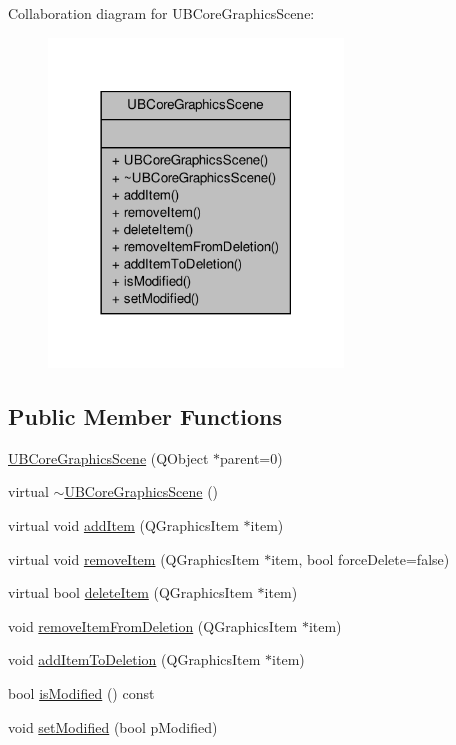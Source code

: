 Collaboration diagram for U\-B\-Core\-Graphics\-Scene\-:
\nopagebreak
\begin{figure}[H]
\begin{center}
\leavevmode
\includegraphics[width=222pt]{dd/d20/class_u_b_core_graphics_scene__coll__graph}
\end{center}
\end{figure}
\subsection*{Public Member Functions}
\begin{DoxyCompactItemize}
\item 
\hyperlink{class_u_b_core_graphics_scene_af9c0bf22cb230f573f3bc44fa5ca6254}{U\-B\-Core\-Graphics\-Scene} (Q\-Object $\ast$parent=0)
\item 
virtual \hyperlink{class_u_b_core_graphics_scene_a4c518fefac178048cefc42eb0550a59f}{$\sim$\-U\-B\-Core\-Graphics\-Scene} ()
\item 
virtual void \hyperlink{class_u_b_core_graphics_scene_a0a190111cab43448533b69bf8699ab38}{add\-Item} (Q\-Graphics\-Item $\ast$item)
\item 
virtual void \hyperlink{class_u_b_core_graphics_scene_a73c3f6532917e3ccb189f3cdeae989bb}{remove\-Item} (Q\-Graphics\-Item $\ast$item, bool force\-Delete=false)
\item 
virtual bool \hyperlink{class_u_b_core_graphics_scene_aa834de4c7e8874b466bdbccda0ef2053}{delete\-Item} (Q\-Graphics\-Item $\ast$item)
\item 
void \hyperlink{class_u_b_core_graphics_scene_a310c66a09239231971b65da11d89886f}{remove\-Item\-From\-Deletion} (Q\-Graphics\-Item $\ast$item)
\item 
void \hyperlink{class_u_b_core_graphics_scene_a240a89647f25063e195ceaae23277fbb}{add\-Item\-To\-Deletion} (Q\-Graphics\-Item $\ast$item)
\item 
bool \hyperlink{class_u_b_core_graphics_scene_a401164930b6963b7ec2f1d157f9dca4b}{is\-Modified} () const 
\item 
void \hyperlink{class_u_b_core_graphics_scene_ad92b735788dc8e172f091a13e899b783}{set\-Modified} (bool p\-Modified)
\end{DoxyCompactItemize}


